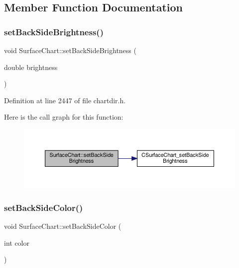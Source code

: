 \subsection{Member Function Documentation}
\mbox{\label{class_surface_chart_a8d7c77fe6e72c7a0cdb4f9b7fe3ee886}} 
\subsubsection{\texorpdfstring{set\+Back\+Side\+Brightness()}{setBackSideBrightness()}}
{\footnotesize\ttfamily void Surface\+Chart\+::set\+Back\+Side\+Brightness (\begin{DoxyParamCaption}\item[{double}]{brightness }\end{DoxyParamCaption})\hspace{0.3cm}{\ttfamily [inline]}}



Definition at line 2447 of file chartdir.\+h.

Here is the call graph for this function\+:
\nopagebreak
\begin{figure}[H]
\begin{center}
\leavevmode
\includegraphics[width=350pt]{class_surface_chart_a8d7c77fe6e72c7a0cdb4f9b7fe3ee886_cgraph}
\end{center}
\end{figure}
\mbox{\label{class_surface_chart_a94b772a2242149700813a53810bb437d}} 
\subsubsection{\texorpdfstring{set\+Back\+Side\+Color()}{setBackSideColor()}}
{\footnotesize\ttfamily void Surface\+Chart\+::set\+Back\+Side\+Color (\begin{DoxyParamCaption}\item[{int}]{color }\end{DoxyParamCaption})\hspace{0.3cm}{\ttfamily [inline]}}



